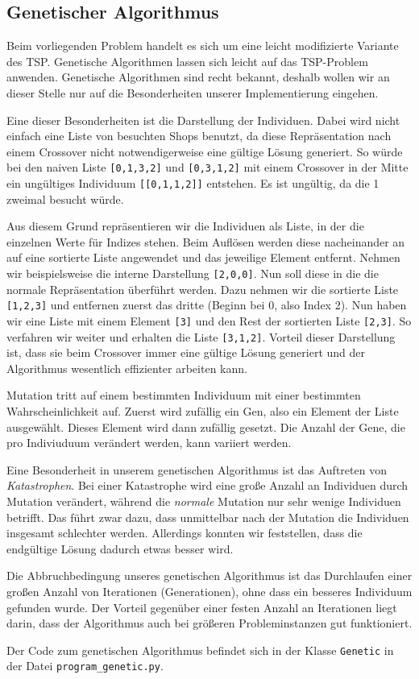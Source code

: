 ﻿\subsection{Genetischer Algorithmus}

Beim vorliegenden Problem handelt es sich um eine leicht modifizierte Variante des TSP. Genetische Algorithmen lassen sich leicht auf das TSP-Problem anwenden. Genetische Algorithmen sind recht bekannt, deshalb wollen wir an dieser Stelle nur auf die Besonderheiten unserer Implementierung eingehen.

Eine dieser Besonderheiten ist die Darstellung der Individuen. Dabei wird nicht einfach eine Liste von besuchten Shops benutzt, da diese Repräsentation nach einem Crossover nicht notwendigerweise eine gültige Lösung generiert. So würde bei den naiven Liste \texttt{[0,1,3,2]} und \texttt{[0,3,1,2]} mit einem Crossover in der Mitte ein ungültiges Individuum \texttt{[[0,1,1,2]]} entstehen. Es ist ungültig, da die 1 zweimal besucht würde. 

Aus diesem Grund repräsentieren wir die Individuen als Liste, in der die einzelnen Werte für Indizes stehen. Beim Auflösen werden diese nacheinander an auf eine sortierte Liste angewendet und das jeweilige Element entfernt. Nehmen wir beispielsweise die interne Darstellung \texttt{[2,0,0]}. Nun soll diese in die die normale Repräsentation überführt werden. Dazu nehmen wir die sortierte Liste \texttt{[1,2,3]} und entfernen zuerst das dritte (Beginn bei 0, also Index 2). Nun haben wir eine Liste mit einem Element \texttt{[3]} und den Rest der sortierten Liste \texttt{[2,3]}. So verfahren wir weiter und erhalten die Liste \texttt{[3,1,2]}. Vorteil dieser Darstellung ist, dass sie beim Crossover immer eine gültige Lösung generiert und der Algorithmus wesentlich effizienter arbeiten kann.

Mutation tritt auf einem bestimmten Individuum mit einer bestimmten Wahrscheinlichkeit auf. Zuerst wird zufällig ein Gen, also ein Element der Liste ausgewählt. Dieses Element wird dann zufällig gesetzt. Die Anzahl der Gene, die pro Indiviuduum verändert werden, kann variiert werden. 

Eine Besonderheit in unserem genetischen Algorithmus ist das Auftreten von \emph{Katastrophen}. Bei einer Katastrophe wird eine große Anzahl an Individuen durch Mutation verändert, während die \emph{normale} Mutation nur sehr wenige Individuen betrifft. Das führt zwar dazu, dass unmittelbar nach der Mutation die Individuen insgesamt schlechter werden. Allerdings konnten wir feststellen, dass die endgültige Lösung dadurch etwas besser wird. 

Die Abbruchbedingung unseres genetischen Algorithmus ist das Durchlaufen einer großen Anzahl von Iterationen (Generationen), ohne dass ein besseres Individuum gefunden wurde. Der Vorteil gegenüber einer festen Anzahl an Iterationen liegt darin, dass der Algorithmus auch bei größeren Probleminstanzen gut funktioniert.

Der Code zum genetischen Algorithmus befindet sich in der Klasse \texttt{Genetic} in der Datei \texttt{program\_genetic.py}.

